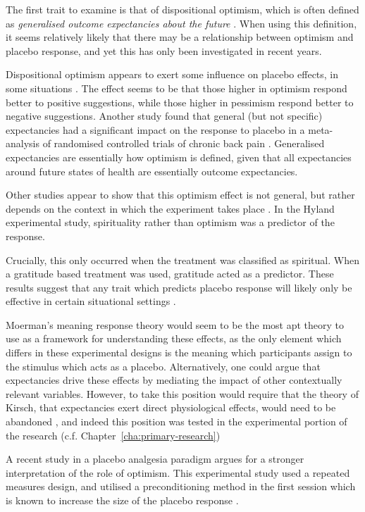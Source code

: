\documentclass{article}
\begin{document}
The first trait to examine is that of dispositional optimism, which is often defined as \textit{generalised outcome expectancies about the future} \cite{Carver2010}. When using this definition, it seems relatively likely that there may be a relationship between optimism and placebo response, and yet this has only been investigated in recent years. 

Dispositional optimism appears to exert some influence on placebo effects, in some situations \cite{Geers2005,morton2009reproducibility}. The effect seems to be that those higher in optimism respond better to positive suggestions, while those higher in pessimism respond better to negative suggestions. Another study found that general (but not specific) expectancies had a significant impact on the response to placebo in a meta-analysis of randomised controlled trials of chronic back pain \cite{myers2008patient}. Generalised expectancies are essentially how optimism is defined, given that all expectancies around future states of health are essentially outcome expectancies. 

Other studies appear to  show that this optimism effect is not general, but rather depends on the context in which the experiment takes place \cite{Hyland2006}. In the Hyland experimental study, spirituality rather than optimism was a predictor of the response.  

Crucially, this only occurred when the treatment was classified as spiritual. When a gratitude based treatment was used, gratitude acted as a predictor. These results suggest that any trait which predicts placebo response will likely only be effective in certain situational settings \cite{Kaptchuk2008a}. 

Moerman's meaning response theory would seem to be the most apt theory to use as a framework for understanding these effects, as the only element which differs in these experimental designs is the meaning which participants assign to the stimulus which acts as a placebo. Alternatively, one could argue that expectancies drive these effects by mediating the impact of other contextually relevant variables. However, to take this position would require that the theory of Kirsch, that expectancies exert direct physiological effects, would need to be abandoned \cite{Kirsch1985}, and indeed this position was tested in the experimental portion of the research (c.f. Chapter~\ref{cha:primary-research})

A recent study \cite{morton2009reproducibility} in a placebo analgesia paradigm argues for a stronger interpretation of the role of optimism. This experimental study used a repeated measures design, and utilised a preconditioning method in the first session which is known to increase the size of the placebo response \cite{Voudouris1985}. 
\end{document}
